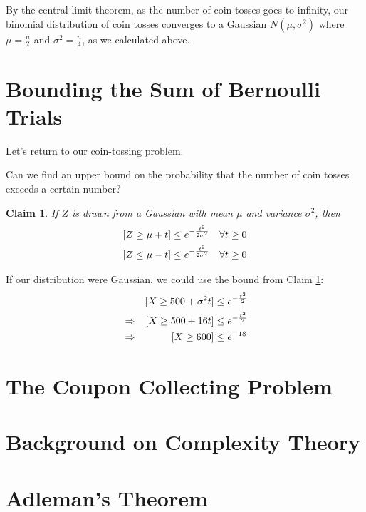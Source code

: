 \documentclass[11pt]{article}
\let\Pr\relax
\DeclareMathOperator*{\Pr}{\mathbb{P}}
\newtheorem{claim}[theorem]{Claim}
\begin{document}
By the central limit theorem, as the number of coin tosses goes to infinity, our binomial distribution of coin tosses converges to a Gaussian $N(\mu, \sigma^2)$ where $\mu = \frac{n}{2}$ and $\sigma^2 = \frac{n}{4}$, as we calculated above.

\section{Bounding the Sum of Bernoulli Trials}

Let's return to our coin-tossing problem.

Can we find an upper bound on the probability that the number of coin tosses exceeds a certain number?

\begin{claim}\label{gaussianbound}
  If $Z$ is drawn from a Gaussian with mean $\mu$ and variance $\sigma^2$, then
  \begin{align*}
    \Pr[Z \ge \mu + t] &\le e^{-\frac{t^2}{2\sigma^2}} \quad \forall t \ge 0 \\
    \Pr[Z \le \mu - t] &\le e^{-\frac{t^2}{2\sigma^2}} \quad \forall t \ge 0
  \end{align*}

\end{claim}
If our distribution were Gaussian, we could use the bound from Claim \ref{gaussianbound}:
\begin{align*}
  &&\Pr[X \ge 500 + \sigma^2 t] &\le e^{-\frac{t^2}{2}} \\
  &\Rightarrow &\Pr[X \ge 500 + 16t] &\le e^{-\frac{t^2}{2}} \\
  &\Rightarrow &\Pr[X \ge 600] &\le e^{-18} \\
\end{align*}



\section{The Coupon Collecting Problem}

\section{Background on Complexity Theory}

\section{Adleman's Theorem}



\begin{thebibliography}{42}


\end{thebibliography}
\end{document}
